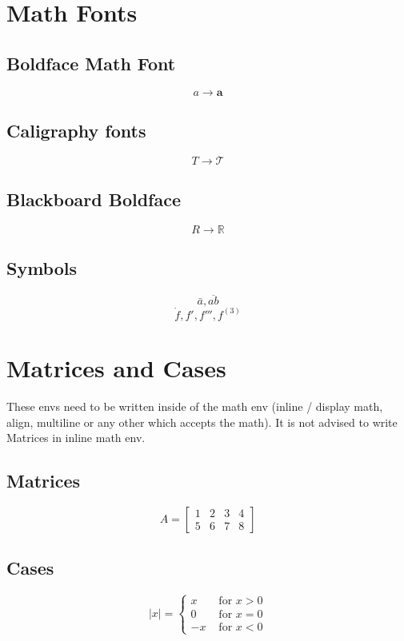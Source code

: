 \documentclass[12pt,titlepage]{article}
\begin{document}
\section{Math Fonts}
\subsection{Boldface Math Font}
\[a \rightarrow \mathbf{a}\]
\subsection{Caligraphy fonts}
\[T \rightarrow \mathcal{T}\]

\subsection{Blackboard Boldface}
\[R \rightarrow \mathbb{R}\]

\subsection{Symbols}
\[\bar{a}, \overline{ab}\]
\[\dot f, f', f''', f^{(3)}\]

\newpage
\section{Matrices and Cases}
These envs need to be written inside of the math env (inline / display math, align, multiline or any other which accepts the math). It is not advised to write Matrices in inline math env.
\subsection{Matrices}
\[
    A = 
    \begin{bmatrix}
        1 & 2 & 3 & 4 \\
        5 & 6 & 7 & 8 
    \end{bmatrix}
\]

\subsection{Cases}
\[
    |x| = 
    \begin{cases}
        x & \text{ for } x > 0 \\
        0 & \text{ for } x = 0 \\
        -x & \text{ for } x < 0
    \end{cases}
\]
\end{document}

